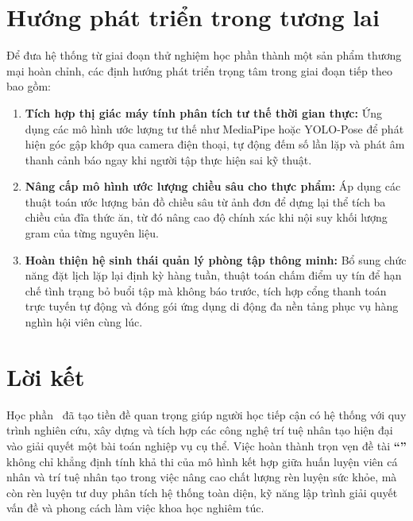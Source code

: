 \section{Hướng phát triển trong tương lai}
\label{sec:huongphattrien}

Để đưa hệ thống từ giai đoạn thử nghiệm học phần thành một sản phẩm thương mại hoàn chỉnh, các định hướng phát triển trọng tâm trong giai đoạn tiếp theo bao gồm:
\begin{enumerate}[label=\arabic*)]
    \item \textbf{Tích hợp thị giác máy tính phân tích tư thế thời gian thực:} Ứng dụng các mô hình ước lượng tư thế như MediaPipe hoặc YOLO-Pose để phát hiện góc gập khớp qua camera điện thoại, tự động đếm số lần lặp và phát âm thanh cảnh báo ngay khi người tập thực hiện sai kỹ thuật.
    \item \textbf{Nâng cấp mô hình ước lượng chiều sâu cho thực phẩm:} Áp dụng các thuật toán ước lượng bản đồ chiều sâu từ ảnh đơn để dựng lại thể tích ba chiều của đĩa thức ăn, từ đó nâng cao độ chính xác khi nội suy khối lượng gram của từng nguyên liệu.
    \item \textbf{Hoàn thiện hệ sinh thái quản lý phòng tập thông minh:} Bổ sung chức năng đặt lịch lặp lại định kỳ hàng tuần, thuật toán chấm điểm uy tín để hạn chế tình trạng bỏ buổi tập mà không báo trước, tích hợp cổng thanh toán trực tuyến tự động và đóng gói ứng dụng di động đa nền tảng phục vụ hàng nghìn hội viên cùng lúc.
\end{enumerate}

\section{Lời kết}
\label{sec:loiket}

Học phần \course\ đã tạo tiền đề quan trọng giúp người học tiếp cận có hệ thống với quy trình nghiên cứu, xây dựng và tích hợp các công nghệ trí tuệ nhân tạo hiện đại vào giải quyết một bài toán nghiệp vụ cụ thể. Việc hoàn thành trọn vẹn đề tài \textbf{``\reporttitle''} không chỉ khẳng định tính khả thi của mô hình kết hợp giữa huấn luyện viên cá nhân và trí tuệ nhân tạo trong việc nâng cao chất lượng rèn luyện sức khỏe, mà còn rèn luyện tư duy phân tích hệ thống toàn diện, kỹ năng lập trình giải quyết vấn đề và phong cách làm việc khoa học nghiêm túc.
